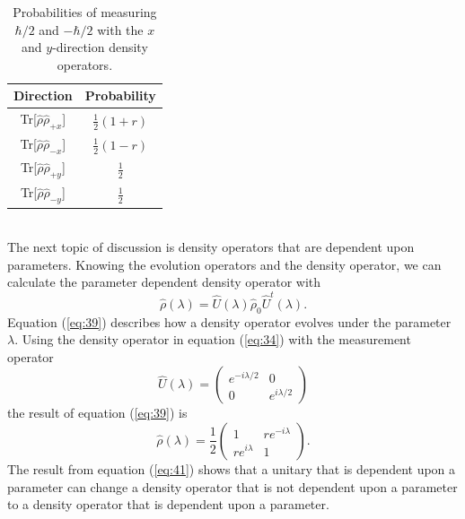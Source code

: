 \documentclass[twocolumn]{article}
\begin{document}
\begin{table}[h!]
\begin{center}
\begin{tabular}{ |c|c| }
\hline Direction & Probability \\
\hline Tr[$\hat{\rho}\hat{\rho}_{+x}$] & $\frac{1}{2}(1+r)$ \\
\hline Tr[$\hat{\rho}\hat{\rho}_{-x}$] & $\frac{1}{2}(1-r)$ \\
\hline Tr[$\hat{\rho}\hat{\rho}_{+y}$] & $\frac{1}{2}$ \\
\hline Tr[$\hat{\rho}\hat{\rho}_{-y}$] & $\frac{1}{2}$ \\
\hline
\end{tabular} 
\caption{Probabilities of measuring $\hbar/2$ and $-\hbar/2$ with the $x$ and $y$-direction density operators.}
\end{center}
\end{table} \\

The next topic of discussion is density operators that are dependent upon parameters. Knowing the evolution operators and the density operator, we can calculate the parameter dependent density operator with
\begin{equation} \label{eq:39}
\hat{\rho}(\lambda)=\hat{U}(\lambda)\hat{\rho}_0\hat{U}^{t}(\lambda).
\end{equation}
Equation (\ref{eq:39}) describes how a density operator evolves under the parameter $\lambda$. Using the density operator in equation (\ref{eq:34}) with the measurement operator
\begin{equation} \label{eq:40}
\hat{U}(\lambda)=
\begin{pmatrix}
e^{-i\lambda/2} & 0 \\
0 & e^{i\lambda/2}
\end{pmatrix}
\end{equation}
the result of equation (\ref{eq:39}) is
\begin{equation} \label{eq:41}
\hat{\rho}(\lambda)=\frac{1}{2}
\begin{pmatrix}
1 & re^{-i\lambda} \\
re^{i\lambda} & 1
\end{pmatrix}.
\end{equation}
The result from equation (\ref{eq:41}) shows that a unitary that is dependent upon a parameter can change a density operator that is not dependent upon a parameter to a density operator that is dependent upon a parameter.
\end{document}
